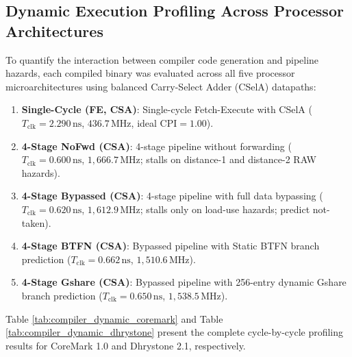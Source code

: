 \subsection{Dynamic Execution Profiling Across Processor Architectures}
To quantify the interaction between compiler code generation and pipeline hazards, each compiled binary was evaluated across all five processor microarchitectures using balanced Carry-Select Adder (CSelA) datapaths:
\begin{enumerate}
    \item \textbf{Single-Cycle (FE, CSA)}: Single-cycle Fetch-Execute with CSelA ($T_{\text{clk}} = 2.290\,\text{ns}$, $436.7\,\text{MHz}$, ideal $\text{CPI} = 1.00$).
    \item \textbf{4-Stage NoFwd (CSA)}: 4-stage pipeline without forwarding ($T_{\text{clk}} = 0.600\,\text{ns}$, $1,666.7\,\text{MHz}$; stalls on distance-1 and distance-2 RAW hazards).
    \item \textbf{4-Stage Bypassed (CSA)}: 4-stage pipeline with full data bypassing ($T_{\text{clk}} = 0.620\,\text{ns}$, $1,612.9\,\text{MHz}$; stalls only on load-use hazards; predict not-taken).
    \item \textbf{4-Stage BTFN (CSA)}: Bypassed pipeline with Static BTFN branch prediction ($T_{\text{clk}} = 0.662\,\text{ns}$, $1,510.6\,\text{MHz}$).
    \item \textbf{4-Stage Gshare (CSA)}: Bypassed pipeline with 256-entry dynamic Gshare branch prediction ($T_{\text{clk}} = 0.650\,\text{ns}$, $1,538.5\,\text{MHz}$).
\end{enumerate}

Table \ref{tab:compiler_dynamic_coremark} and Table \ref{tab:compiler_dynamic_dhrystone} present the complete cycle-by-cycle profiling results for CoreMark 1.0 and Dhrystone 2.1, respectively.


